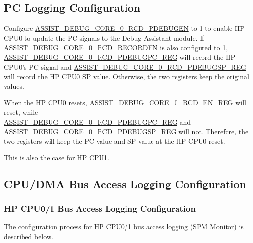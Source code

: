 \documentclass[main\_\_EN.tex]{subfiles}
\begin{document}
\subsection{PC Logging Configuration}

Configure \hyperref[fielddesc:ASSISTDEBUGCORE0RCDPDEBUGEN]{ASSIST\_DEBUG\_CORE\_0\_RCD\_PDEBUGEN} to 1 to enable HP CPU0 to update the PC signals to the Debug Assistant module. If \hyperref[fielddesc:ASSISTDEBUGCORE0RCDRECORDEN]{ASSIST\_DEBUG\_CORE\_0\_RCD\_RECORDEN} is also configured to 1, \\\hyperref[regdesc:ASSISTDEBUGCORE0RCDPDEBUGPCREG]{ASSIST\_DEBUG\_CORE\_0\_RCD\_PDEBUGPC\_REG} will record the HP CPU0's PC signal and \hyperref[regdesc:ASSISTDEBUGCORE0RCDPDEBUGSPREG]{ASSIST\_DEBUG\_CORE\_0\_RCD\_PDEBUGSP\_REG} will record the HP CPU0 SP value. Otherwise, the two registers keep the original values.

When the HP CPU0 resets, \hyperref[regdesc:ASSISTDEBUGCORE0RCDENREG]{ASSIST\_DEBUG\_CORE\_0\_RCD\_EN\_REG} will reset, while \\ \hyperref[regdesc:ASSISTDEBUGCORE0RCDPDEBUGPCREG]{ASSIST\_DEBUG\_CORE\_0\_RCD\_PDEBUGPC\_REG}  and \hyperref[regdesc:ASSISTDEBUGCORE0RCDPDEBUGSPREG]{ASSIST\_DEBUG\_CORE\_0\_RCD\_PDEBUGSP\_REG} will not. Therefore, the two registers will keep the PC value and SP value at the HP CPU0 reset.

This is also the case for HP CPU1.


\subsection{CPU/DMA Bus Access Logging Configuration}

\subsubsection{HP CPU0/1 Bus Access Logging Configuration}
\label{sec:hp_cpu_access_mon}

The configuration process for HP CPU0/1 bus access logging (SPM Monitor) is described below.
\end{document}
